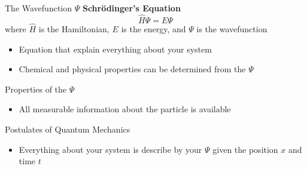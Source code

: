 \documentclass[11pt]{beamer}
\begin{document}
\begin{frame}{The Wavefunction $\Psi$}
  \textbf{Schr\"{o}dinger's Equation}
  \begin{equation}
    \hat{H}\Psi = E\Psi
  \end{equation}
  where $\hat{H}$ is the Hamiltonian, $E$ is the energy,
  and $\Psi$ is the wavefunction
  \begin{itemize}
  \item Equation that explain everything about your system
  \item Chemical and physical properties can be determined
    from the $\Psi$
  \end{itemize}
\end{frame}

\begin{frame}{Properties of the $\Psi$}
  \begin{itemize}
  \item All measurable information about the particle is available
  \end{itemize}
\end{frame}

\begin{frame}{Postulates of Quantum Mechanics}
  \begin{itemize}
  \item Everything about your system is describe by your $\Psi$ given
    the position $x$ and time $t$
  \end{itemize}
\end{frame}
\end{document}
